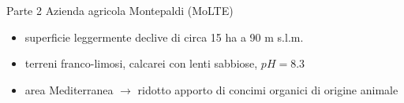 \documentclass[xcolor={usenames, table, x11names}, final, 10pt]{beamer}
\begin{document}
\begin{frame}{Parte 2 \small{Azienda agricola Montepaldi (MoLTE)}}
  \begin{overlayarea}{\textwidth}{0.20\textheight}
    \begin{itemize}[<+->]
    \item superficie leggermente declive di circa 15 ha a 90
      m s.l.m.
    \item terreni franco-limosi, calcarei con lenti sabbiose, $pH = 8.3$
    \item area Mediterranea $\rightarrow$ ridotto apporto di concimi
      organici di origine animale
    \end{itemize}
  \end{overlayarea}
  \vfill
  \begin{overlayarea}{\textwidth}{0.45\textheight}

  \end{overlayarea}  
\end{frame}
\end{document}
